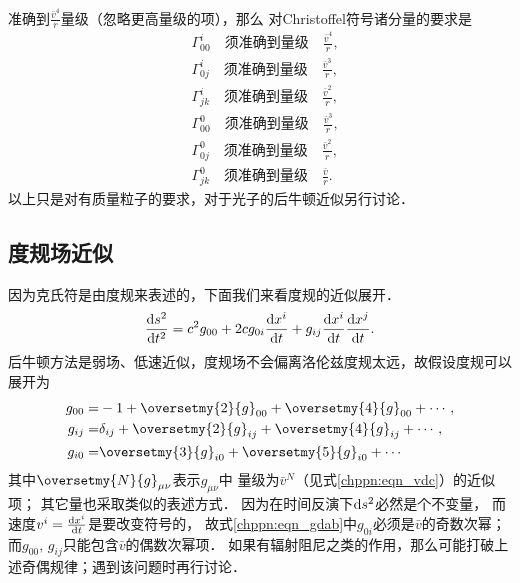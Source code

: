 准确到$\frac{\bar{v}^4}{r}$量级（忽略更高量级的项），那么
对Christoffel符号诸分量的要求是
\begin{subequations}
\begin{align}
    & \Gamma_{00}^i {\quad \text{须准确到量级}\quad } \frac{\bar{v}^4}{r},  \\
    & \Gamma_{0j}^i {\quad \text{须准确到量级}\quad } \frac{\bar{v}^3}{r},  \\
    & \Gamma_{jk}^i {\quad \text{须准确到量级}\quad } \frac{\bar{v}^2}{r},  \\
    & \Gamma_{00}^0 {\quad \text{须准确到量级}\quad } \frac{\bar{v}^3}{r},  \\
    & \Gamma_{0j}^0 {\quad \text{须准确到量级}\quad } \frac{\bar{v}^2}{r},  \\
    & \Gamma_{jk}^0 {\quad \text{须准确到量级}\quad } \frac{\bar{v}}{r}.
\end{align}
\end{subequations}
以上只是对有质量粒子的要求，对于光子的后牛顿近似另行讨论．

\subsection{度规场近似}
因为克氏符是由度规来表述的，下面我们来看度规的近似展开．
\begin{equation}
    \frac{{\rm d} s^2}{{\rm d}t^2} = c^2 g_{00} + 2 c g_{0i} \frac{{\rm d} x^i}{{\rm d}t}
     + g_{ij} \frac{{\rm d} x^i}{{\rm d}t}  \frac{{\rm d} x^j}{{\rm d}t} .
\end{equation}
后牛顿方法是弱场、低速近似，度规场不会偏离洛伦兹度规太远，故假设度规可以展开为
\begin{subequations}\label{chppn:eqn_gdab}
\begin{align}
    g_{00} =& -1 + \oversetmy{2}{g}_{00}+\oversetmy{4}{g}_{00}+ \cdots,  \\
    g_{ij} =& \delta_{ij} + \oversetmy{2}{g}_{ij}+\oversetmy{4}{g}_{ij}+ \cdots,  \\
    g_{i0} =& \oversetmy{3}{g}_{i0}+\oversetmy{5}{g}_{i0}+ \cdots
\end{align}
\end{subequations}
{\kaishu 其中$\oversetmy{N}{g}_{\mu\nu}$表示$g_{\mu\nu}$中
    量级为$\bar{v}^N$（见式\eqref{chppn:eqn_vdc}）的近似项；
其它量也采取类似的表述方式．} 因为在时间反演下${\rm d} s^2$必然是个不变量，
而速度$v^i=\frac{{\rm d} x^i}{{\rm d}t}$是要改变符号的，
故式\eqref{chppn:eqn_gdab}中$g_{0i}$必须是$\bar{v}$的奇数次幂；
而$g_{00},\, g_{ij}$只能包含$\bar{v}$的偶数次幂项．
如果有辐射阻尼之类的作用，那么可能打破上述奇偶规律；遇到该问题时再行讨论．

